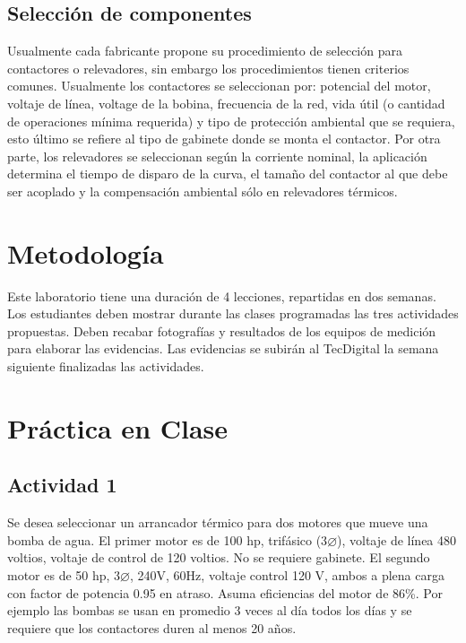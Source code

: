 \subsection{Selección de componentes}

Usualmente cada fabricante propone su procedimiento de selección para contactores o relevadores, sin embargo los procedimientos tienen criterios comunes. Usualmente los contactores se seleccionan por: potencial del motor, voltaje de línea, voltage de la bobina, frecuencia de la red, vida útil (o cantidad de operaciones mínima requerida) y tipo de protección ambiental que se requiera, esto último se refiere al tipo de gabinete donde se monta el contactor. 
Por otra parte, los relevadores se seleccionan según la corriente nominal, la aplicación determina el tiempo de disparo de la curva, el tamaño del contactor al que debe ser acoplado y la compensación ambiental sólo en relevadores térmicos.  

  
\section{Metodología}

Este laboratorio tiene una duración de 4 lecciones, repartidas en dos semanas. Los estudiantes deben mostrar durante las clases programadas las tres actividades propuestas. Deben recabar fotografías y resultados de los equipos de medición para elaborar las evidencias. Las evidencias se subirán al TecDigital la semana siguiente finalizadas las actividades.

\section{Práctica en Clase}

\subsection{Actividad 1}

 Se desea seleccionar un arrancador térmico para dos motores que mueve una bomba de agua. El primer motor es de 100 hp, trifásico (3$\varnothing$), voltaje de línea 480 voltios, voltaje de control de 120 voltios. No se requiere gabinete. El segundo motor es de 50 hp, 3$\varnothing$, 240V, 60Hz, voltaje control 120 V, ambos a plena carga con factor de potencia 0.95 en atraso. Asuma eficiencias del motor de 86\%. Por ejemplo las bombas se usan en promedio 3 veces al día todos los días y se requiere que los contactores duren al menos 20 años. 
 
